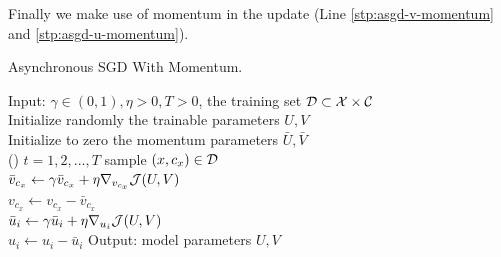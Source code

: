 Finally we make use of momentum in the update (Line \ref{stp:asgd-v-momentum} and \ref{stp:asgd-u-momentum}).

\begin{algorithm2e}[htb]
\caption{Asynchronous SGD With Momentum.}
\label{alg:asgd}
  Input: $\gamma \in (0, 1), \eta > 0, T > 0$, 
  the training set $\mathcal{D} \subset \mathcal{X} \times \mathcal{C}$ \\
  Initialize randomly the trainable parameters $U, V$ \\
  Initialize to zero the momentum parameters $\bar U, \bar V$ \\
   {
    \For() {$t=1,2,...,T$} {
	    sample $(x, c_x) \in \mathcal{D}$ \\
	    $\bar v_{c_x} \gets \gamma \bar v_{c_x} + \eta \nabla_{v_{c_x}} \mathcal{J}(U, V)$ \\
	    \label{stp:asgd-update-begin}
	    \label{stp:asgd-v-momentum}
	    $v_{c_x} \gets v_{c_x} - \bar v_{c_x}$ \\
	     {
	    	$\bar u_i \gets \gamma \bar u_i + \eta \nabla_{u_i} \mathcal{J}(U, V)$ \\
		    \label{stp:asgd-u-momentum}
	    	$u_i \gets u_i - \bar u_i$
	    }
	    \label{stp:asgd-update-end}
    }
  }
  Output: model parameters $U, V$
\end{algorithm2e}
























